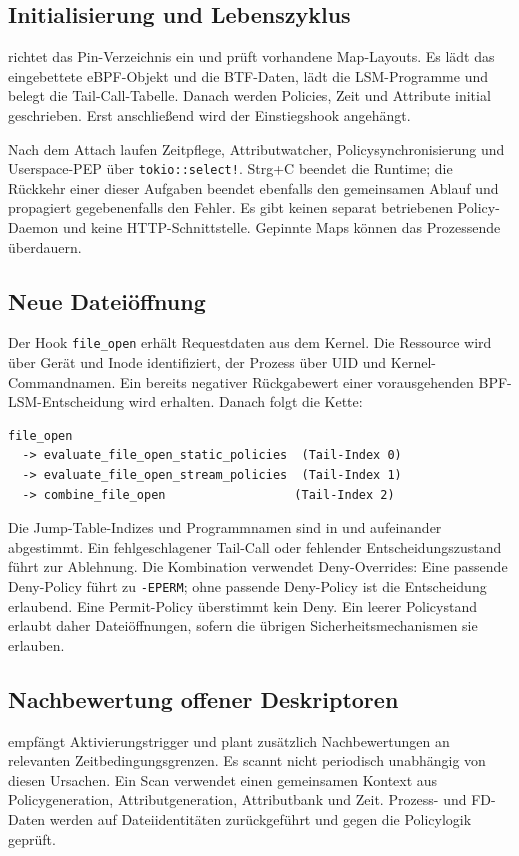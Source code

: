 \documentclass[12pt,a4paper]{article}
\begin{document}
\subsection{Initialisierung und Lebenszyklus}
 richtet das Pin-Verzeichnis ein und prüft vorhandene
Map-Layouts. Es lädt das eingebettete eBPF-Objekt und die BTF-Daten, lädt die
LSM-Programme und belegt die Tail-Call-Tabelle. Danach werden Policies, Zeit und
Attribute initial geschrieben. Erst anschließend wird der Einstiegshook angehängt.

Nach dem Attach laufen Zeitpflege, Attributwatcher, Policysynchronisierung und
Userspace-PEP über \texttt{tokio::select!}. Strg+C beendet die Runtime; die Rückkehr
einer dieser Aufgaben beendet ebenfalls den gemeinsamen Ablauf und propagiert
gegebenenfalls den Fehler. Es gibt keinen separat betriebenen Policy-Daemon und
keine HTTP-Schnittstelle. Gepinnte Maps können das Prozessende überdauern.

\subsection{Neue Dateiöffnung}
Der Hook \texttt{file\_open} erhält Requestdaten aus dem Kernel. Die Ressource wird
über Gerät und Inode identifiziert, der Prozess über UID und Kernel-Commandnamen.
Ein bereits negativer Rückgabewert einer vorausgehenden BPF-LSM-Entscheidung wird
erhalten. Danach folgt die Kette:
\begin{lstlisting}
file_open
  -> evaluate_file_open_static_policies  (Tail-Index 0)
  -> evaluate_file_open_stream_policies  (Tail-Index 1)
  -> combine_file_open                  (Tail-Index 2)
\end{lstlisting}
Die Jump-Table-Indizes und Programmnamen sind in  und
 aufeinander abgestimmt.
Ein fehlgeschlagener Tail-Call oder fehlender Entscheidungszustand führt zur
Ablehnung. Die Kombination verwendet Deny-Overrides: Eine passende Deny-Policy
führt zu \texttt{-EPERM}; ohne passende Deny-Policy ist die Entscheidung erlaubend.
Eine Permit-Policy überstimmt kein Deny. Ein leerer Policystand erlaubt daher
Dateiöffnungen, sofern die übrigen Sicherheitsmechanismen sie erlauben.

\subsection{Nachbewertung offener Deskriptoren}
 empfängt Aktivierungstrigger und plant
zusätzlich Nachbewertungen an relevanten Zeitbedingungsgrenzen. Es scannt
 nicht periodisch unabhängig von diesen Ursachen.
Ein Scan verwendet einen gemeinsamen Kontext aus Policygeneration,
Attributgeneration, Attributbank und Zeit. Prozess- und FD-Daten werden auf
Dateiidentitäten zurückgeführt und gegen die Policylogik geprüft.
\end{document}
